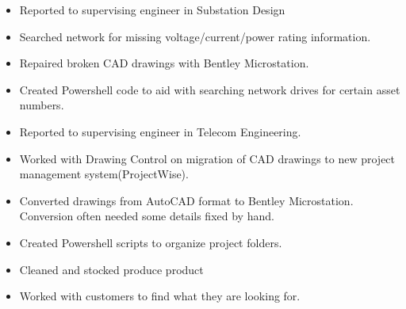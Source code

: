 \documentclass[10pt,a4paper,ragged2e]{altacv}
\begin{document}
\divider

\begin{itemize}
\item Reported to supervising engineer in Substation Design
\item Searched network for missing voltage/current/power rating information.
\item Repaired broken CAD drawings with Bentley Microstation.
\item Created Powershell code to aid with searching network drives for certain asset numbers.
\end{itemize}

\divider

\begin{itemize}
\item Reported to supervising engineer in Telecom Engineering.
\item Worked with Drawing Control on migration of CAD drawings to new project management system(ProjectWise).
\item Converted drawings from AutoCAD format to Bentley Microstation. Conversion often needed some details fixed by hand.
\item Created Powershell scripts to organize project folders.
\end{itemize}

\divider

\begin{itemize}
\item Cleaned and stocked produce product
\item Worked with customers to find what they are looking for.
\end{itemize}


\end{document}
